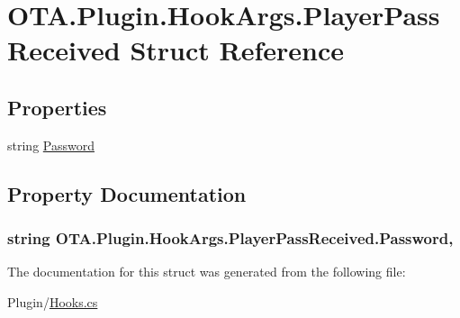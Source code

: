 \hypertarget{struct_o_t_a_1_1_plugin_1_1_hook_args_1_1_player_pass_received}{}\section{O\+T\+A.\+Plugin.\+Hook\+Args.\+Player\+Pass\+Received Struct Reference}
\label{struct_o_t_a_1_1_plugin_1_1_hook_args_1_1_player_pass_received}
\subsection*{Properties}
\begin{DoxyCompactItemize}
\item 
string \hyperlink{struct_o_t_a_1_1_plugin_1_1_hook_args_1_1_player_pass_received_a09033fc8aa5bc9e14e8dac407db1362b}{Password}
\end{DoxyCompactItemize}


\subsection{Property Documentation}
\hypertarget{struct_o_t_a_1_1_plugin_1_1_hook_args_1_1_player_pass_received_a09033fc8aa5bc9e14e8dac407db1362b}{}
\subsubsection[{Password}]{\setlength{\rightskip}{0pt plus 5cm}string O\+T\+A.\+Plugin.\+Hook\+Args.\+Player\+Pass\+Received.\+Password\hspace{0.3cm}{\ttfamily [get]}, {\ttfamily [set]}}\label{struct_o_t_a_1_1_plugin_1_1_hook_args_1_1_player_pass_received_a09033fc8aa5bc9e14e8dac407db1362b}


The documentation for this struct was generated from the following file\+:\begin{DoxyCompactItemize}
\item 
Plugin/\hyperlink{_hooks_8cs}{Hooks.\+cs}\end{DoxyCompactItemize}
